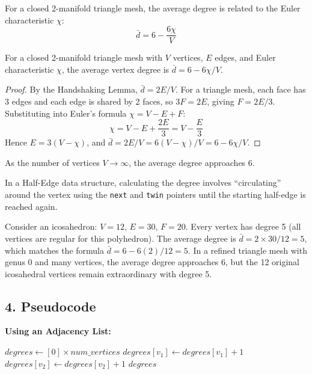 For a closed 2-manifold triangle mesh, the average degree is related to the Euler characteristic $\chi$:
$$\bar{d} = 6 - \frac{6\chi}{V}$$

\begin{theorem}\label{thm:avg_degree}
For a closed 2-manifold triangle mesh with $V$ vertices, $E$ edges, and Euler characteristic $\chi$, the average vertex degree is $\bar{d} = 6 - 6\chi / V$.
\end{theorem}

\begin{proof}
By the Handshaking Lemma\cite{diestel2017}, $\bar{d} = 2E / V$. For a triangle mesh, each face has 3 edges and each edge is shared by 2 faces, so $3F = 2E$, giving $F = 2E/3$. Substituting into Euler's formula $\chi = V - E + F$:
$$\chi = V - E + \frac{2E}{3} = V - \frac{E}{3}$$
Hence $E = 3(V - \chi)$, and $\bar{d} = 2E/V = 6(V - \chi)/V = 6 - 6\chi/V$.
\end{proof}

As the number of vertices $V \to \infty$, the average degree approaches 6.

In a Half-Edge\cite{guibas1985} data structure, calculating the degree involves ``circulating'' around the vertex using the \texttt{next} and \texttt{twin} pointers until the starting half-edge is reached again.

\begin{example}\label{ex:valence_distribution}
Consider an icosahedron: $V = 12$, $E = 30$, $F = 20$. Every vertex has degree 5 (all vertices are regular for this polyhedron). The average degree is $\bar{d} = 2 \times 30 / 12 = 5$, which matches the formula $\bar{d} = 6 - 6(2)/12 = 5$. In a refined triangle mesh with genus 0 and many vertices, the average degree approaches 6, but the 12 original icosahedral vertices remain extraordinary with degree 5.
\end{example}

\subsection{4. Pseudocode}

\textbf{Using an Adjacency List:}

\begin{algorithm}
\caption{Calculate Vertex Degrees}
\label{alg:calculate_degrees}
\begin{algorithmic}[1]
    \State $\mathit{degrees} \gets [0] \times \mathit{num\_vertices}$
        \State $\mathit{degrees}[v_1] \gets \mathit{degrees}[v_1] + 1$
        \State $\mathit{degrees}[v_2] \gets \mathit{degrees}[v_2] + 1$
    \EndFor
    \State \Return $\mathit{degrees}$
\EndFunction
\end{algorithmic}
\end{algorithm}

